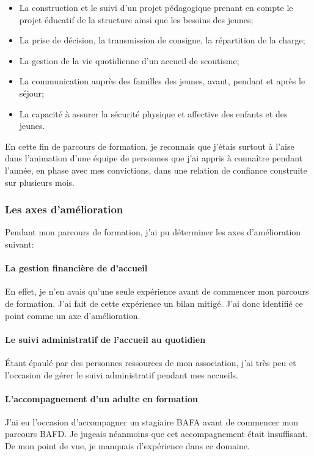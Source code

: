 \documentclass[titlepage,11pt,a4paper]{article}
\begin{document}
\begin{itemize}
   \item La construction et le suivi d'un projet pédagogique prenant en compte le
      projet éducatif de la structure ainsi que les besoins des jeunes;
   \item La prise de décision, la transmission de consigne, la répartition de la charge;
   \item La gestion de la vie quotidienne d'un accueil de scoutisme;
   \item La communication auprès des familles des jeunes, avant, pendant et après le
      séjour;
   \item La capacité à assurer la sécurité physique et affective des enfants et des
      jeunes.
\end{itemize}

En cette fin de parcours de formation, je reconnais que j'étais surtout à l'aise dans
l'animation d'une équipe de personnes que j'ai appris à connaître pendant l'année,
en phase avec mes convictions, dans une relation de confiance construite sur plusieurs mois.

\subsubsection{Les axes d'amélioration}

Pendant mon parcours de formation, j'ai pu déterminer les axes d'amélioration suivant:

\paragraph{La gestion financière de d'accueil} En effet, je n'en avais
qu'une seule expérience avant de commencer mon parcours de formation. J'ai fait de cette
expérience un bilan mitigé. J'ai donc identifié ce point comme un axe d'amélioration.

\paragraph{Le suivi administratif de l'accueil au quotidien} Étant épaulé par des
personnes ressources de mon association, j'ai très peu et l'occasion de gérer le suivi
administratif pendant mes accueils.

\paragraph{L'accompagnement d'un adulte en formation} J'ai eu l'occasion d'accompagner un
stagiaire BAFA avant de commencer mon parcours BAFD\@. Je jugeais néanmoins que cet
accompagnement était insuffisant. De mon point de vue, je manquais d'expérience dans ce
domaine.
\end{document}

